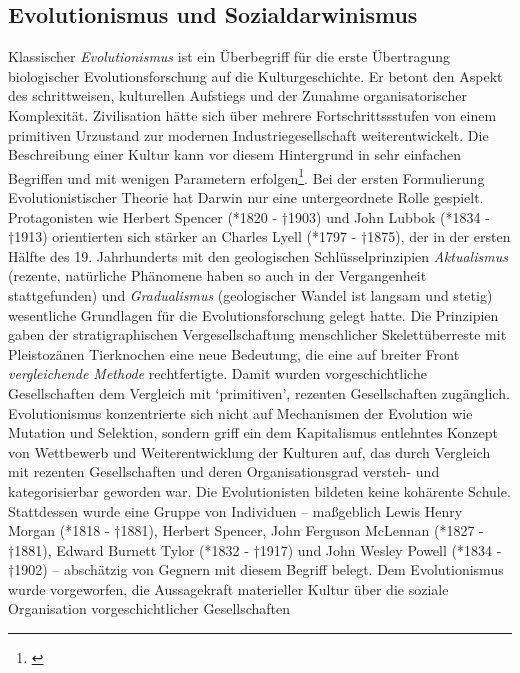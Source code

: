 \documentclass[openany,twoside,twocolumn]{book}
\let\rmarkdownfootnote\footnote%
\def\footnote{\protect\rmarkdownfootnote}
\begin{document}
\hypertarget{evolutionismus-und-sozialdarwinismus}{%
\subsection{Evolutionismus und
Sozialdarwinismus}\label{evolutionismus-und-sozialdarwinismus}}

Klassischer \emph{Evolutionismus} ist ein Überbegriff für die erste
Übertragung biologischer Evolutionsforschung auf die Kulturgeschichte.
Er betont den Aspekt des schrittweisen, kulturellen Aufstiegs und der
Zunahme organisatorischer Komplexität. Zivilisation hätte sich über
mehrere Fortschrittssstufen von einem primitiven Urzustand zur modernen
Industriegesellschaft weiterentwickelt. Die Beschreibung einer Kultur
kann vor diesem Hintergrund in sehr einfachen Begriffen und mit wenigen
Parametern erfolgen\footnote{\textcite{noauthor_evolutionismus_1986}}.
Bei der ersten Formulierung Evolutionistischer Theorie hat Darwin nur
eine untergeordnete Rolle gespielt. Protagonisten wie Herbert Spencer
(*1820 - †1903) und John Lubbok (*1834 - †1913) orientierten sich
stärker an Charles Lyell (*1797 - †1875), der in der ersten Hälfte des
19. Jahrhunderts mit den geologischen Schlüsselprinzipien
\emph{Aktualismus} (rezente, natürliche Phänomene haben so auch in der
Vergangenheit stattgefunden) und \emph{Gradualismus} (geologischer
Wandel ist langsam und stetig) wesentliche Grundlagen für die
Evolutionsforschung gelegt hatte. Die Prinzipien gaben der
stratigraphischen Vergesellschaftung menschlicher Skelettüberreste mit
Pleistozänen Tierknochen eine neue Bedeutung, die eine auf breiter Front
\emph{vergleichende Methode} rechtfertigte. Damit wurden
vorgeschichtliche Gesellschaften dem Vergleich mit `primitiven',
rezenten Gesellschaften zugänglich. Evolutionismus konzentrierte sich
nicht auf Mechanismen der Evolution wie Mutation und Selektion, sondern
griff ein dem Kapitalismus entlehntes Konzept von Wettbewerb und
Weiterentwicklung der Kulturen auf, das durch Vergleich mit rezenten
Gesellschaften und deren Organisationsgrad versteh- und kategorisierbar
geworden war. Die Evolutionisten bildeten keine kohärente Schule.
Stattdessen wurde eine Gruppe von Individuen -- maßgeblich Lewis Henry
Morgan (*1818 - †1881), Herbert Spencer, John Ferguson McLennan (*1827 -
†1881), Edward Burnett Tylor (*1832 - †1917) und John Wesley Powell
(*1834 - †1902) -- abschätzig von Gegnern mit diesem Begriff belegt. Dem
Evolutionismus wurde vorgeworfen, die Aussagekraft materieller Kultur
über die soziale Organisation vorgeschichtlicher Gesellschaften
\end{document}
